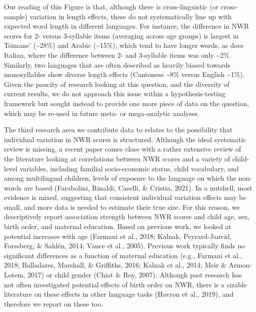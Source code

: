 \documentclass[english,,man,floatsintext]{apa6}
\begin{document}
Our reading of this Figure is that, although there is cross-linguistic (or cross-sample) variation in length effects, these do not systematically line up with expected word length in different languages. For instance, the difference in NWR scores for 2- versus 3-syllable items (averaging across age groups) is largest in Tsimane' (\textasciitilde{}28\%) and Arabic (\textasciitilde{}15\%), which tend to have longer words, as does Italian, where the difference between 2- and 3-syllable items was only \textasciitilde{}2\%. Similarly, two languages that are often described as heavily biased towards monosyllables show diverse length effects (Cantonese \textasciitilde{}8\% versus English \textasciitilde{}1\%). Given the paucity of research looking at this question, and the diversity of current results, we do not approach this issue within a hypothesis-testing framework but sought instead to provide one more piece of data on the question, which may be re-used in future meta- or mega-analytic analyses.

The third research area we contribute data to relates to the possibility that individual variation in NWR scores is structured. Although the ideal systematic review is missing, a recent paper comes close with a rather extensive review of the literature looking at correlations between NWR scores and a variety of child-level variables, including familial socio-economic status, child vocabulary, and among multilingual children, levels of exposure to the language on which the non-words are based (Farabolini, Rinaldi, Caselli, \& Cristia, 2021). In a nutshell, most evidence is mixed, suggesting that consistent individual variation effects may be small, and more data is needed to estimate their true size. For this reason, we descriptively report association strength between NWR scores and child age, sex, birth order, and maternal education. Based on previous work, we looked at potential increases with age (Farmani et al., 2018; Kalnak, Peyrard-Janvid, Forssberg, \& Sahlén, 2014; Vance et al., 2005). Previous work typically finds no significant differences as a function of maternal education (e.g., Farmani et al., 2018; Balladares, Marshall, \& Griffiths, 2016; Kalnak et al., 2014; Meir \& Armon-Lotem, 2017) or child gender (Chiat \& Roy, 2007). Although past research has not often investigated potential effects of birth order on NWR, there is a sizable literature on these effects in other language tasks (Havron et al., 2019), and therefore we report on these too.
\end{document}
